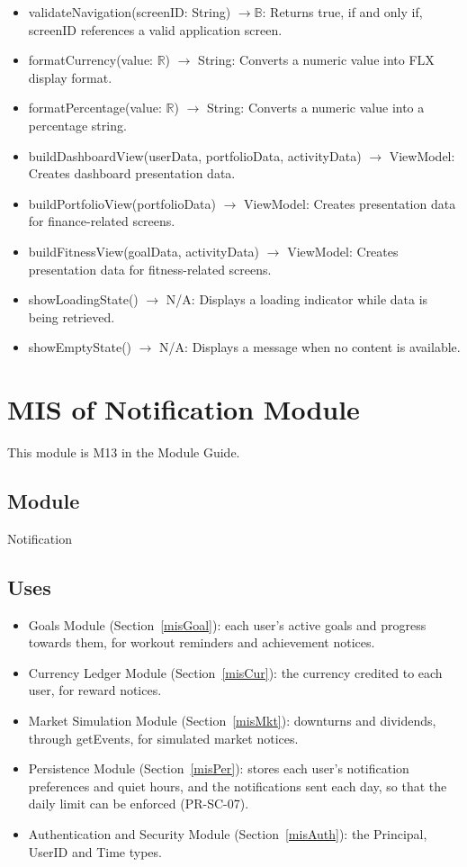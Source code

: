 \documentclass[12pt, titlepage]{article}
\begin{document}
\begin{itemize}
  \item validateNavigation(screenID: String) $\rightarrow \mathbb{B}$: Returns true, if and only if, screenID references a valid application screen.
  \item formatCurrency(value: $\mathbb{R}$) $\rightarrow$ String: Converts a numeric value into FLX display format.
  \item formatPercentage(value: $\mathbb{R}$) $\rightarrow$ String: Converts a numeric value into a percentage string.
  \item buildDashboardView(userData, portfolioData, activityData) $\rightarrow$ ViewModel: Creates dashboard presentation data.
  \item buildPortfolioView(portfolioData) $\rightarrow$ ViewModel: Creates presentation data for finance-related screens.
  \item buildFitnessView(goalData, activityData) $\rightarrow$ ViewModel: Creates presentation data for fitness-related screens.
  \item showLoadingState() $\rightarrow$ N/A: Displays a loading indicator while data is being retrieved.
  \item showEmptyState() $\rightarrow$ N/A: Displays a message when no content is available.
\end{itemize}

\section{MIS of Notification Module} \label{misNoti}

This module is M13 in the Module Guide.

\subsection{Module}

Notification

\subsection{Uses}

\begin{itemize}
\item Goals Module (Section~\ref{misGoal}): each user's active goals and
  progress towards them, for workout reminders and achievement notices.
\item Currency Ledger Module (Section~\ref{misCur}): the currency credited to
  each user, for reward notices.
\item Market Simulation Module (Section~\ref{misMkt}): downturns and
  dividends, through getEvents, for simulated market notices.
\item Persistence Module (Section~\ref{misPer}): stores each user's
  notification preferences and quiet hours, and the notifications sent each
  day, so that the daily limit can be enforced (PR-SC-07).
\item Authentication and Security Module (Section~\ref{misAuth}): the
  Principal, UserID and Time types.
\end{itemize}
\end{document}
